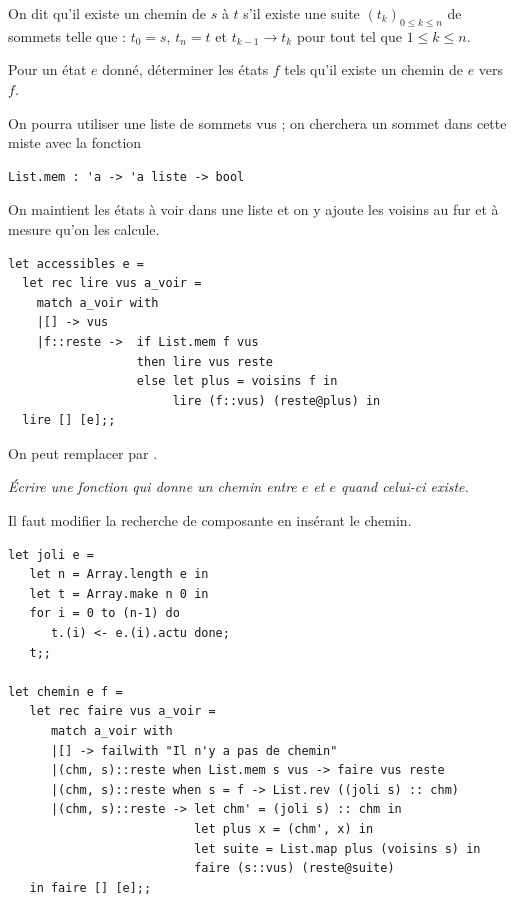 On dit qu'il existe un chemin de $s$ à $t$ s'il existe une suite $(t_k )_{0\le k \le n}$ de sommets telle que :
$t_0 = s$, $t_n = t$ et $t_{k-1}\rightarrow t_k$ pour tout tel que $1\le k\le n$.
\begin{Exercise}\it 

Pour un état $e$ donné, déterminer les états $f$ tels qu'il existe un chemin de $e$ vers $f$.

On pourra utiliser une liste de sommets vus ; on cherchera un sommet dans cette miste avec la fonction 
\begin{lstlisting}
List.mem : 'a -> 'a liste -> bool
\end{lstlisting}
\end{Exercise}
\begin{Answer}
On maintient les états à voir dans une liste et on y ajoute les voisins au fur et à mesure qu'on les calcule.
\begin{lstlisting}
let accessibles e = 
  let rec lire vus a_voir =
    match a_voir with
    |[] -> vus
    |f::reste ->  if List.mem f vus
                  then lire vus reste
                  else let plus = voisins f in
                       lire (f::vus) (reste@plus) in
  lire [] [e];;
\end{lstlisting}
On peut remplacer  par .
\newpage
\end{Answer}
\begin{Exercise}
{\it Écrire une fonction qui donne un chemin entre $e$ et $e$ quand celui-ci existe.}
\end{Exercise}
\begin{Answer}
Il faut modifier la recherche de composante en insérant le chemin.
\begin{lstlisting}
let joli e =
   let n = Array.length e in
   let t = Array.make n 0 in
   for i = 0 to (n-1) do
      t.(i) <- e.(i).actu done;
   t;;
  
let chemin e f = 
   let rec faire vus a_voir =
      match a_voir with
      |[] -> failwith "Il n'y a pas de chemin"
      |(chm, s)::reste when List.mem s vus -> faire vus reste
      |(chm, s)::reste when s = f -> List.rev ((joli s) :: chm)
      |(chm, s)::reste -> let chm' = (joli s) :: chm in 
                          let plus x = (chm', x) in
                          let suite = List.map plus (voisins s) in
                          faire (s::vus) (reste@suite) 
   in faire [] [e];;
\end{lstlisting}
\end{Answer}



